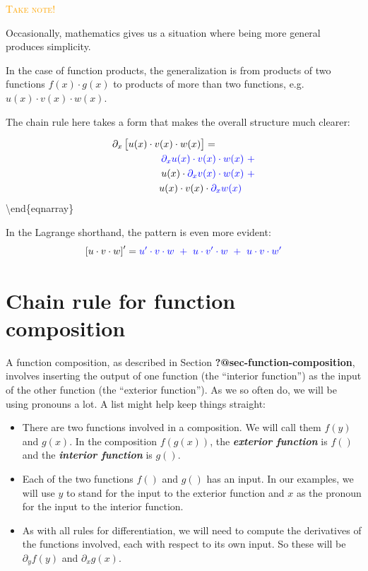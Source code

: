 \documentclass[
  letterpaper,
  DIV=11,
  numbers=noendperiod,
  oneside]{scrreprt}
\providecommand{\tightlist}{%
  \setlength{\itemsep}{0pt}\setlength{\parskip}{0pt}}
\newenvironment{takenote}%
{%
\textcolor{orange}{\hrulefill}%
  \par\vspace{.3\baselineskip}%
  \textcolor{orange}{\scshape Take note!}%
  \par\vspace{\baselineskip}%
}%
{\textcolor{orange}{\hrulefill}}
\begin{document}
\begin{takenote}
Occasionally, mathematics gives us a situation where being more general
produces simplicity.

In the case of function products, the generalization is from products of
two functions \(f(x)\cdot g(x)\) to products of more than two functions,
e.g.~\(u(x) \cdot v(x) \cdot w(x)\).

The chain rule here takes a form that makes the overall structure much
clearer:

\begin{eqnarray}
\partial_x \left[\strut u(x) \cdot v(x) \cdot w(x)\right] = \ \ \ \ \ \ \ \ \ \ \ \ \\
\color{blue}{\partial_x u(x)} \cdot v(x) \cdot w(x)\ + \\ 
u(x) \cdot \color{blue}{\partial_x v(x)} \cdot w(x)\ + \\
u(x) \cdot v(x) \cdot \color{blue}{\partial_x w(x)}\ \  \ \ 
\end{eqnarray}\textbackslash end\{eqnarray\}

In the Lagrange shorthand, the pattern is even more evident:
\[\left[ u\cdot v\cdot w\right]' = \color{blue}{u'}\cdot v\cdot w\ +\ u\cdot \color{blue}{v'}\cdot w\ +\ u\cdot v\cdot \color{blue}{w}'\]

\end{takenote}

\hypertarget{chain-rule-for-function-composition}{%
\section{Chain rule for function
composition}\label{chain-rule-for-function-composition}}

A function composition, as described in Section
\textbf{?@sec-function-composition}, involves inserting the output of
one function (the ``interior function'') as the input of the other
function (the ``exterior function''). As we so often do, we will be
using pronouns a lot. A list might help keep things straight:

\begin{itemize}
\tightlist
\item
  There are two functions involved in a composition. We will call them
  \(f(y)\) and \(g(x)\). In the composition \(f(g(x))\), the
  \textbf{\emph{exterior function}} is \(f()\) and the
  \textbf{\emph{interior function}} is \(g()\).
\item
  Each of the two functions \(f()\) and \(g()\) has an input. In our
  examples, we will use \(y\) to stand for the input to the exterior
  function and \(x\) as the pronoun for the input to the interior
  function.
\item
  As with all rules for differentiation, we will need to compute the
  derivatives of the functions involved, each with respect to its own
  input. So these will be \(\partial_y f(y)\) and \(\partial_x g(x)\).
\end{itemize}
\end{document}
